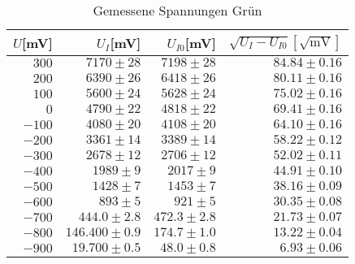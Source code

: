 \newpage
\begin{table}[h]
  \centering
  \caption{Gemessene Spannungen Grün}
    \begin{tabular}{r | r | r | r}
        \toprule
    $U$[mV] & $U_I$[mV] & $U_{I0}$[mV] & $\sqrt{U_I  - U_{I0}}[\sqrt{\text{mV}}]$\\
    \midrule
    $300$&$7170 \pm 28$ & $7198 \pm 28$ & $84.84 \pm 0.16$ \\
    $200$&$6390 \pm 26$ & $6418 \pm 26$ & $80.11 \pm 0.16$ \\
    $100$&$5600\pm 24 $   &$ 5628 \pm 24$ & $75.02 \pm 0.16$ \\
    $0$&$4790 \pm 22$ & $4818\pm 22$ & $69.41\pm 0.16 $\\
    $-100$&$4080 \pm 20 $ & $4108 \pm 20$ & $64.10 \pm 0.16 $\\
    $-200$&$3361  \pm 14$ & $3389 \pm 14$ & $58.22 \pm 0.12$ \\
    $-300$&$2678 \pm 12$ & $2706 \pm 12$ & $52.02 \pm 0.11 $\\
    $-400$&$1989 \pm 9 $& $2017 \pm 9$ & $44.91\pm 0.10$ \\
    $-500$&$1428 \pm 7$ & $1453 \pm 7$ & $38.16 \pm 0.09$ \\
    $-600$&$893 \pm 5$ & $921 \pm 5$ & $30.35 \pm 0.08$ \\
    $-700$&$444.0 \pm 2.8$ & $472.3 \pm 2.8$ & $21.73 \pm 0.07$ \\
    $-800$&$146.400 \pm 0.9$ & $174.7 \pm 1.0$ & $13.22 \pm 0.04$ \\
    $-900$&$19.700 \pm 0.5$ & $48.0    \pm 0.8 $& $6.93 \pm 0.06 $\\
    \bottomrule
    \end{tabular}%
\end{table}%


